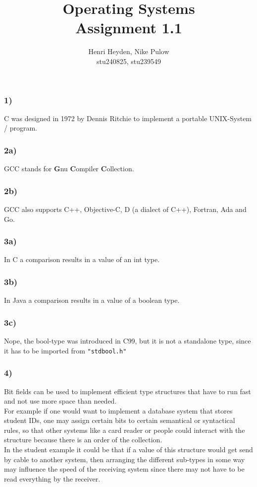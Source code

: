 \documentclass[12pt, a4paper]{article}
\title{Operating Systems\\Assignment 1.1}
\author{Henri Heyden, Nike Pulow \\ \small stu240825, stu239549}
\date{}
\begin{document}
\maketitle

\singlespacing

\subsubsection*{1)}
C was designed in 1972 by Dennis Ritchie to implement a portable UNIX-System / program.
\subsubsection*{2a)}
GCC stands for \textbf{G}nu \textbf{C}ompiler \textbf{C}ollection.
\subsubsection*{2b)}
GCC also supports C++, Objective-C, D (a dialect of C++), Fortran, Ada and Go.
\subsubsection*{3a)}
In C a comparison results in a value of an int type.
\subsubsection*{3b)}
In Java a comparison results in a value of a boolean type.
\subsubsection*{3c)}
Nope, the bool-type was introduced in C99, but it is not a standalone type, since it has to be imported from \verb|"stdbool.h"|
\subsubsection*{4)}
Bit fields can be used to implement efficient type structures that have to run fast and not use more space than needed. \\
For example if one would want to implement a database system that stores student IDs, one may assign certain bits to certain semantical or syntactical rules, so that other systems like a card reader or people could interact with the structure because there is an order of the collection. \\
In the student example it could be that if a value of this structure would get send by cable to another system, then arranging the different sub-types in some way may influence the speed of the receiving system since there may not have to be read everything by the receiver.
\end{document}

